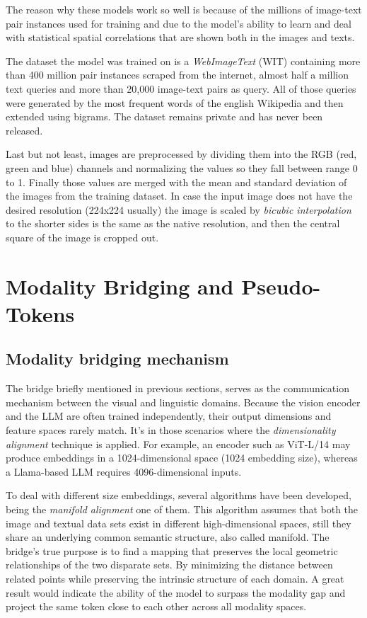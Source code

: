 The reason why these models work so well is because of the millions of image-text pair instances used for training and due to the model's ability to learn and deal with statistical spatial correlations that are shown both in the images and texts.

The dataset the model was trained on is a \textit{WebImageText} (WIT) containing more than 400 million pair instances scraped from the internet, almost half a million text queries and more than 20,000 image-text pairs as query. All of those queries were generated by the most frequent words of the english Wikipedia and then extended using bigrams. The dataset remains private and has never been released. 

Last but not least, images are preprocessed by dividing them into the RGB (red, green and blue) channels and normalizing the values so they fall between range 0 to 1. Finally those values are merged with the mean and standard deviation of the images from the training dataset. In case the input image does not have the desired resolution (224x224 usually) the image is scaled by \textit{bicubic interpolation} \cite{wiki:bicubic_interpolation} to the shorter sides is the same as the native resolution, and then the central square of the image is cropped out.


\section{Modality Bridging and Pseudo-Tokens}
\subsection{Modality bridging mechanism}
The bridge briefly mentioned in previous sections, serves as the communication mechanism between the visual and linguistic domains. Because the vision encoder and the LLM are often trained independently, their output dimensions and feature spaces rarely match. It's in those scenarios where the \textit{dimensionality alignment} technique is applied. For example, an encoder such as ViT-L/14 may produce embeddings in a 1024-dimensional space (1024 embedding size), whereas a Llama-based LLM requires 4096-dimensional inputs.

To deal with different size embeddings, several algorithms have been developed, being the \textit{manifold alignment} \cite{wiki:manifold_alignment} one of them. This algorithm assumes that both the image and textual data sets exist in different high-dimensional spaces, still they share an underlying common semantic structure, also called manifold. The bridge's true purpose is to find a mapping that preserves the local geometric relationships of the two disparate sets. By minimizing the distance between related points while preserving the intrinsic structure of each domain. A great result would indicate the ability of the model to surpass the modality gap and project the same token close to each other across all modality spaces. 

